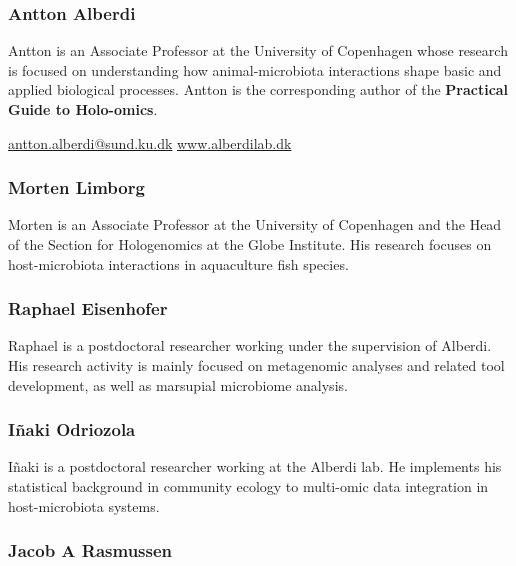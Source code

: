 \documentclass[
]{book}
\begin{document}
\hypertarget{antton-alberdi}{%
\subsubsection*{Antton Alberdi}\label{antton-alberdi}}

Antton is an Associate Professor at the University of Copenhagen whose research is focused on understanding how animal-microbiota interactions shape basic and applied biological processes. Antton is the corresponding author of the \textbf{Practical Guide to Holo-omics}.

\url{antton.alberdi@sund.ku.dk} \textbar{} \url{www.alberdilab.dk}

\hypertarget{morten-limborg}{%
\subsubsection*{Morten Limborg}\label{morten-limborg}}

Morten is an Associate Professor at the University of Copenhagen and the Head of the Section for Hologenomics at the Globe Institute. His research focuses on host-microbiota interactions in aquaculture fish species.

\hypertarget{raphael-eisenhofer}{%
\subsubsection*{Raphael Eisenhofer}\label{raphael-eisenhofer}}

Raphael is a postdoctoral researcher working under the supervision of Alberdi. His research activity is mainly focused on metagenomic analyses and related tool development, as well as marsupial microbiome analysis.

\hypertarget{inaki-odriozola}{%
\subsubsection*{Iñaki Odriozola}\label{inaki-odriozola}}

Iñaki is a postdoctoral researcher working at the Alberdi lab. He implements his statistical background in community ecology to multi-omic data integration in host-microbiota systems.

\hypertarget{jacob-rasmussen}{%
\subsubsection*{Jacob A Rasmussen}\label{jacob-rasmussen}}
\end{document}
